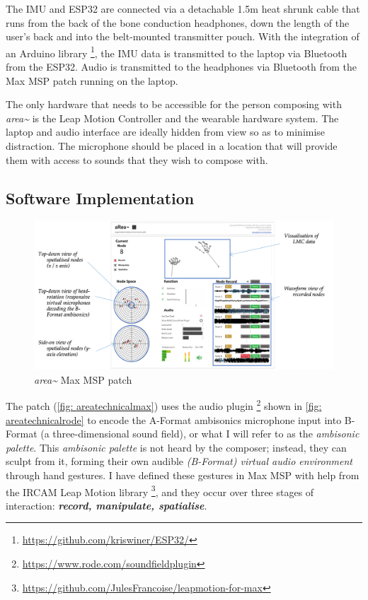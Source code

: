 The IMU and ESP32 are connected via a detachable 1.5m heat shrunk cable that runs from the back of the bone conduction headphones, down the length of the user's back and into the belt-mounted transmitter pouch. With the integration of an Arduino library \footnote{\url{https://github.com/kriswiner/ESP32/}}, the IMU data is transmitted to the laptop via Bluetooth from the ESP32. Audio is transmitted to the headphones via Bluetooth from the Max MSP patch running on the laptop. 

The only hardware that needs to be accessible for the person composing with \textit{area\textasciitilde{}} is the Leap Motion Controller and the wearable hardware system. The laptop and audio interface are ideally hidden from view so as to minimise distraction. The microphone should be placed in a location that will provide them with access to sounds that they wish to compose with.

\subsection{Software Implementation}            \label{sec: area-system-software}

\begin{figure}
    \centering
    \includegraphics[width=\linewidth]{figures/05-area/areatechnical_max.png}
    \caption{\textit{area\textasciitilde{}} Max MSP patch}
    \label{fig: areatechnicalmax}
\end{figure}
The patch (\autoref{fig: areatechnicalmax}) uses the audio plugin \footnote{\url{https://www.rode.com/soundfieldplugin}} shown in \autoref{fig: areatechnicalrode} to encode the A-Format ambisonics microphone input into B-Format (a three-dimensional sound field), or what I will refer to as the \textit{ambisonic palette}. This \textit{ambisonic palette} is not heard by the composer; instead, they can sculpt from it, forming their own audible \textit{(B-Format) virtual audio environment} through hand gestures. I have defined these gestures in Max MSP with help from the IRCAM Leap Motion library \citeyearpar{ircam2014} \footnote{\url{https://github.com/JulesFrancoise/leapmotion-for-max}}, and they occur over three stages of interaction: \textit{\textbf{record, manipulate, spatialise}}. 


